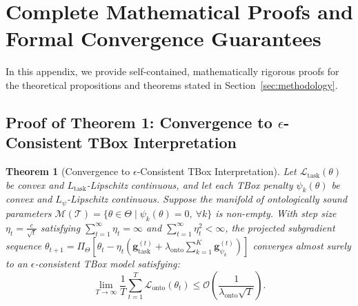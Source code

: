 \documentclass[11pt,a4paper]{article}
\newtheorem*{theorem*}{Theorem}
\begin{document}
\appendix

\section{Complete Mathematical Proofs and Formal Convergence Guarantees}
\label{sec:appendix_proofs}

In this appendix, we provide self-contained, mathematically rigorous proofs for the theoretical propositions and theorems stated in Section~\ref{sec:methodology}.

\subsection{Proof of Theorem 1: Convergence to $\epsilon$-Consistent TBox Interpretation}
\label{proof:thm1}

\begin{theorem*}[Convergence to $\epsilon$-Consistent TBox Interpretation]
Let $\mathcal{L}_{\mathrm{task}}(\theta)$ be convex and $L_{\mathrm{task}}$-Lipschitz continuous, and let each TBox penalty $\psi_k(\theta)$ be convex and $L_{\psi}$-Lipschitz continuous. Suppose the manifold of ontologically sound parameters $\mathcal{M}(\mathcal{T}) = \{\theta \in \Theta \mid \psi_k(\theta) = 0, \ \forall k\}$ is non-empty. With step size $\eta_t = \frac{c}{\sqrt{t}}$ satisfying $\sum_{t=1}^\infty \eta_t = \infty$ and $\sum_{t=1}^\infty \eta_t^2 < \infty$, the projected subgradient sequence $\theta_{t+1} = \Pi_\Theta \left[ \theta_t - \eta_t (\mathbf{g}_{\mathrm{task}}^{(t)} + \lambda_{\mathrm{onto}} \sum_{k=1}^K \mathbf{g}_{\psi_k}^{(t)}) \right]$ converges almost surely to an $\epsilon$-consistent TBox model satisfying:
\begin{equation}
\lim_{T \to \infty} \frac{1}{T} \sum_{t=1}^T \mathcal{L}_{\mathrm{onto}}(\theta_t) \le \mathcal{O}\left( \frac{1}{\lambda_{\mathrm{onto}} \sqrt{T}} \right).
\end{equation}
\end{theorem*}
\end{document}
